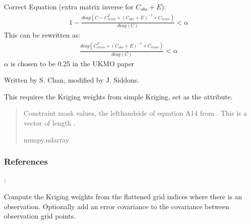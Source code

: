 \documentclass[letterpaper,10pt,english]{sphinxmanual}
\begin{document}
\begin{fulllineitems}
\begin{fulllineitems}
\sphinxAtStartPar
Correct Equation (extra matrix inverse for \(C_{obs} + E\)):
\begin{equation*}
\begin{split}1 - \frac{
    diag(C - C_{cross}^T \times (C_{obs} + E)^{-1}
             \times C_{cross})
}{diag(C)} < \alpha\end{split}
\end{equation*}
\sphinxAtStartPar
This can be re\sphinxhyphen{}written as:
\begin{equation*}
\begin{split}\frac{diag(C_{cross}^T \times (C_{obs} + E)^{-1} \times C_{cross})}
{diag(C)} < \alpha\end{split}
\end{equation*}
\sphinxAtStartPar
\(\alpha\) is chosen to be 0.25 in the UKMO paper

\sphinxAtStartPar
Written by S. Chan, modified by J. Siddons.

\sphinxAtStartPar
This requires the Kriging weights from simple Kriging, set as the
 attribute.
\begin{quote}\begin{description}
\sphinxAtStartPar
{} \textendash{} Constraint mask values, the left\sphinxhyphen{}hand\sphinxhyphen{}side of equation A14 from
. This is a vector of length .

\sphinxAtStartPar
numpy.ndarray

\end{description}\end{quote}
\subsubsection*{References}

\sphinxAtStartPar
{}: 

\end{fulllineitems}


\begin{fulllineitems}
\label{\detokenize{kriging:glomar_gridding.stochastic.StochasticKriging.get_kriging_weights}}
\pysigstartsignatures
\pysiglinewithargsret
{}
{}
{}
\pysigstopsignatures
\sphinxAtStartPar
Compute the Kriging weights from the flattened grid indices where
there is an observation. Optionally add an error covariance to the
covariance between observation grid points.


\end{fulllineitems}
\end{fulllineitems}
\end{document}
